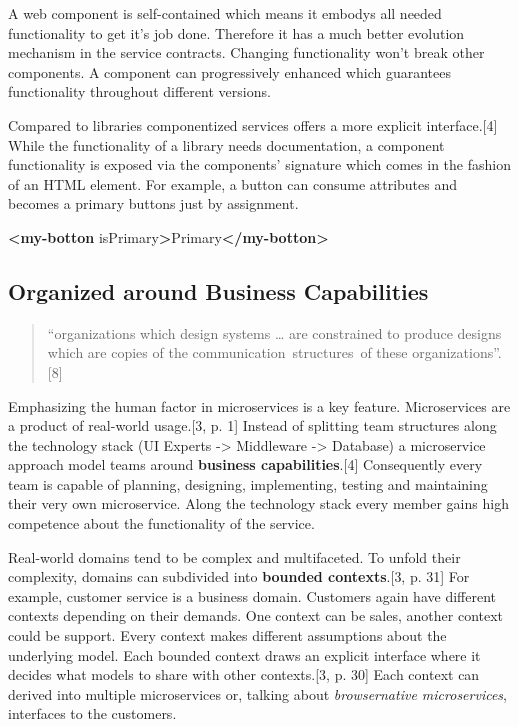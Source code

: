 \documentclass[]{assets/latex/ieee}
\newenvironment{Shaded}{}{}
\newcommand{\KeywordTok}[1]{\textcolor[rgb]{0.00,0.44,0.13}{\textbf{{#1}}}}
\newcommand{\OtherTok}[1]{\textcolor[rgb]{0.00,0.44,0.13}{{#1}}}
\newcommand{\NormalTok}[1]{{#1}}
\begin{document}
A web component is self-contained which means it embodys all needed
functionality to get it's job done. Therefore it has a much better
evolution mechanism in the service contracts. Changing functionality
won't break other components. A component can progressively enhanced
which guarantees functionality throughout different versions.

Compared to libraries componentized services offers a more explicit
interface.{[}4{]} While the functionality of a library needs
documentation, a component functionality is exposed via the components'
signature which comes in the fashion of an HTML element. For example, a
button can consume attributes and becomes a primary buttons just by
assignment.

\begin{Shaded}
\begin{Highlighting}[]
\KeywordTok{<my-botton}\OtherTok{ isPrimary}\KeywordTok{>}\NormalTok{Primary}\KeywordTok{</my-botton>}
\end{Highlighting}
\end{Shaded}

\subsection{Organized around Business
Capabilities}\label{organized-around-business-capabilities}

\begin{quote}
``organizations which design systems \ldots{} are constrained to produce
designs which are copies of the communication~structures~of these
organizations''. {[}8{]}
\end{quote}

Emphasizing the human factor in microservices is a key feature.
Microservices are a product of real-world usage.{[}3, p. 1{]} Instead of
splitting team structures along the technology stack (UI Experts
-\textgreater{} Middleware -\textgreater{} Database) a microservice
approach model teams around \textbf{business capabilities}.{[}4{]}
Consequently every team is capable of planning, designing, implementing,
testing and maintaining their very own microservice. Along the
technology stack every member gains high competence about the
functionality of the service.

Real-world domains tend to be complex and multifaceted. To unfold their
complexity, domains can subdivided into \textbf{bounded contexts}.{[}3,
p. 31{]} For example, customer service is a business domain. Customers
again have different contexts depending on their demands. One context
can be sales, another context could be support. Every context makes
different assumptions about the underlying model. Each bounded context
draws an explicit interface where it decides what models to share with
other contexts.{[}3, p. 30{]} Each context can derived into multiple
microservices or, talking about \emph{browsernative microservices},
interfaces to the customers.
\end{document}
